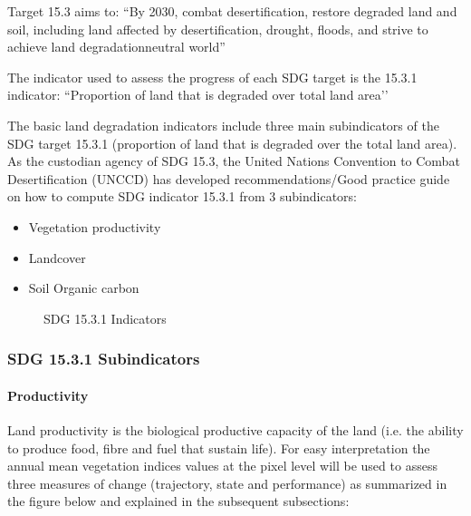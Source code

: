 \documentclass[letterpaper,10pt,english]{sphinxmanual}
\let\sphinxpxdimen\pdfpxdimen\else\newdimen\sphinxpxdimen
\begin{document}
\sphinxAtStartPar
Target 15.3 aims to: “By 2030, combat desertification, restore degraded land and soil, including land affected by desertification, drought, floods, and strive to achieve land degradation\sphinxhyphen{}neutral world”

\sphinxAtStartPar
The indicator used to assess the progress of each SDG target is the 15.3.1 indicator: “Proportion of land that is degraded over total land area’’

\sphinxAtStartPar
The basic land degradation indicators include three main sub\sphinxhyphen{}indicators of the SDG target 15.3.1 (proportion of land that is degraded over the total land area). As the custodian agency of SDG 15.3, the United Nations Convention to Combat Desertification (UNCCD) has developed recommendations/Good practice guide on how to compute SDG indicator 15.3.1  from 3 sub\sphinxhyphen{}indicators:
\begin{itemize}
\item {} 
\sphinxAtStartPar
Vegetation productivity

\item {} 
\sphinxAtStartPar
Landcover

\item {} 
\sphinxAtStartPar
Soil Organic carbon

\end{itemize}

\begin{figure}[H]
\centering
\capstart

\noindent\sphinxincludegraphics[width=500\sphinxpxdimen,height=300\sphinxpxdimen]{{sdg}.png}
\caption{SDG 15.3.1 Indicators}\label{\detokenize{Background/LD_indicators:id2}}\end{figure}


\subsubsection{SDG 15.3.1 Sub\sphinxhyphen{}indicators}
\label{\detokenize{Background/LD_indicators:sdg-15-3-1-sub-indicators}}

\paragraph{Productivity}
\label{\detokenize{Background/LD_indicators:productivity}}
\sphinxAtStartPar
Land productivity is the biological productive capacity of the land (i.e. the ability to produce food, fibre and fuel that sustain life). For easy interpretation the annual mean vegetation indices values at the pixel level will be used to assess three measures of change (trajectory, state and performance) as summarized in the figure below and explained in the subsequent sub\sphinxhyphen{}sections:
\end{document}

